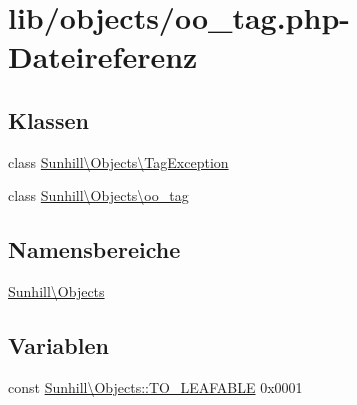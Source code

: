 \hypertarget{oo__tag_8php}{}\section{lib/objects/oo\+\_\+tag.php-\/\+Dateireferenz}
\label{oo__tag_8php}
\subsection*{Klassen}
\begin{DoxyCompactItemize}
\item 
class \hyperlink{classSunhill_1_1Objects_1_1TagException}{Sunhill\textbackslash{}\+Objects\textbackslash{}\+Tag\+Exception}
\item 
class \hyperlink{classSunhill_1_1Objects_1_1oo__tag}{Sunhill\textbackslash{}\+Objects\textbackslash{}oo\+\_\+tag}
\end{DoxyCompactItemize}
\subsection*{Namensbereiche}
\begin{DoxyCompactItemize}
\item 
 \hyperlink{namespaceSunhill_1_1Objects}{Sunhill\textbackslash{}\+Objects}
\end{DoxyCompactItemize}
\subsection*{Variablen}
\begin{DoxyCompactItemize}
\item 
const \hyperlink{namespaceSunhill_1_1Objects_a31ec8901d9505910a094aa39b17968ff}{Sunhill\textbackslash{}\+Objects\+::\+T\+O\+\_\+\+L\+E\+A\+F\+A\+B\+LE} 0x0001
\end{DoxyCompactItemize}
